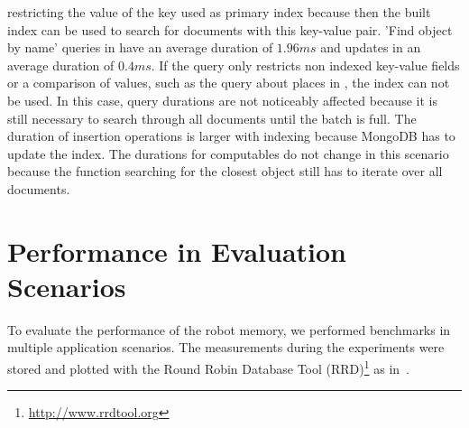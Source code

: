 restricting the value of the key used as primary index because then
the built index can be used to search for documents with this
key-value pair. 'Find object
by name' queries in  have an average duration
of $1.96ms$ and updates in  an average
duration of $0.4ms$. If the query
only restricts non indexed key-value fields or a comparison of values, such as the query about places
in , the index can not be used. In this case, query durations are not noticeably
affected because it is still necessary to search through all documents
until the batch is full. The duration of insertion operations is
larger with indexing because MongoDB has to update the index. The durations for computables do not change in
this scenario because the function searching for the closest object still
has to iterate over all documents.


\section{Performance in Evaluation Scenarios}
\label{sec:performance}
To evaluate the performance of the robot memory, we performed
benchmarks in multiple application scenarios. The measurements during
the experiments were stored and plotted
with the Round Robin Database Tool
(RRD)\footnote{\url{http://www.rrdtool.org}} as in~\cite{RoboDB}.

